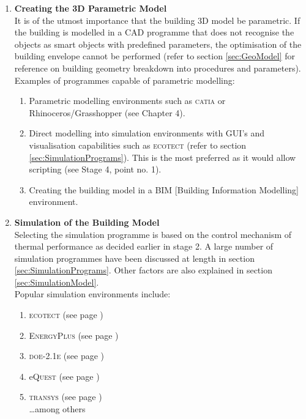 \begin{enumerate} \item \textbf{Creating the 3D Parametric Model}\\[3mm] It is of the utmost importance that the building 3D model be parametric. If the building is modelled in a CAD programme that does not recognise the objects as smart objects with predefined parameters, the optimisation of the building envelope cannot be performed (refer to section \ref{sec:GeoModel} for reference on building geometry breakdown into procedures and parameters).\\
			Examples of programmes capable of parametric modelling:
			\begin{enumerate}
				\item Parametric modelling environments such as \textsc{catia} or Rhinoceros/Grasshopper (see Chapter 4).
				\item Direct modelling into simulation environments with GUI's and visualisation capabilities such as \textsc{ecotect} (refer to section \ref{sec:SimulationPrograms}). This is the most preferred as it would allow scripting (see Stage 4, point no. 1).
				\item Creating the building model in a BIM [Building Information Modelling] environment.
			\end{enumerate}
			\vspace{0.2cm}
		\item \textbf{Simulation of the Building Model}\\[3mm]
			Selecting the simulation programme is based on the control mechanism of thermal performance as decided earlier in stage 2. A large number of simulation programmes have been discussed at length in section \ref{sec:SimulationPrograms}. Other factors are also explained in section \ref{sec:SimulationModel}.\\
			Popular simulation environments include:
			\begin{enumerate}
				\item \textsc{ecotect} (see page \pageref{par:ECOTECT})
				\item \textsc{EnergyPlus} (see page \pageref{par:EnergyPlus})
				\item \textsc{doe-2.1e} (see page \pageref{par:DOE})
				\item e\textsc{Quest} (see page \pageref{par:eQUEST})
				\item \textsc{transys} (see page \pageref{par:TRANSYS})\\
					\ldots among others
			\end{enumerate}
	\end{enumerate}

